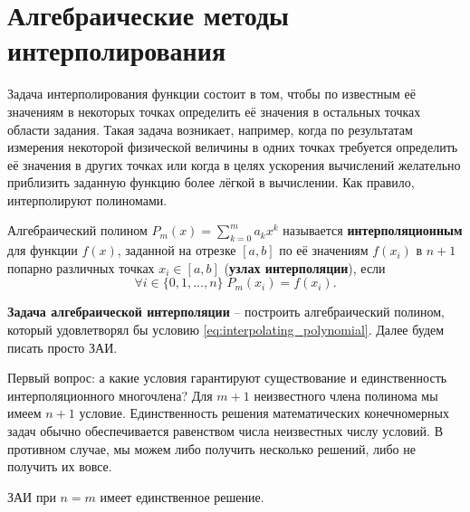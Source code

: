 \documentclass[../main.tex]{subfile}
\begin{document}
\section{Алгебраические методы интерполирования}
Задача интерполирования функции состоит в том, чтобы по известным её значениям
в некоторых точках определить её значения в остальных точках области задания.
Такая задача возникает, например, когда по результатам измерения некоторой
физической величины в одних точках требуется определить её значения в других
точках или когда в целях ускорения вычислений желательно приблизить заданную
функцию более лёгкой в вычислении. Как правило, интерполируют полиномами.

\begin{define}\label{eq:interpolating_polynomial}
	Алгебраический полином $P_m(x)=\sum_{k=0}^{m}a_kx^k$ называется
	\textbf{интерполяционным} для функции $f(x)$, заданной на отрезке
	$[a,b]$ по её значениям $f(x_i)$ в $n+1$ попарно различных точках
	$x_i\in[a,b]$ (\textbf{узлах интерполяции}), если
	\[\forall i\in\{0,1,...,n\}\;P_m(x_i)=f(x_i).\]
\end{define}

\begin{define}\label{eq:interpolation_problem}
	\textbf{Задача алгебраической интерполяции} -- построить алгебраический
	полином, который удовлетворял бы условию
	\eqref{eq:interpolating_polynomial}. Далее будем писать просто ЗАИ.
\end{define}

Первый вопрос: а какие условия гарантируют существование и единственность
интерполяционного многочлена? Для $m+1$ неизвестного члена полинома мы имеем
$n+1$ условие. Единственность решения математических конечномерных задач
обычно обеспечивается равенством числа неизвестных числу условий. В противном
случае, мы можем либо получить несколько решений, либо не получить их вовсе.

\begin{theorem}
\label{eq:polynominal_theorem}
	ЗАИ при $n=m$ имеет единственное решение.
\end{theorem}

\beginproof
\end{document}

